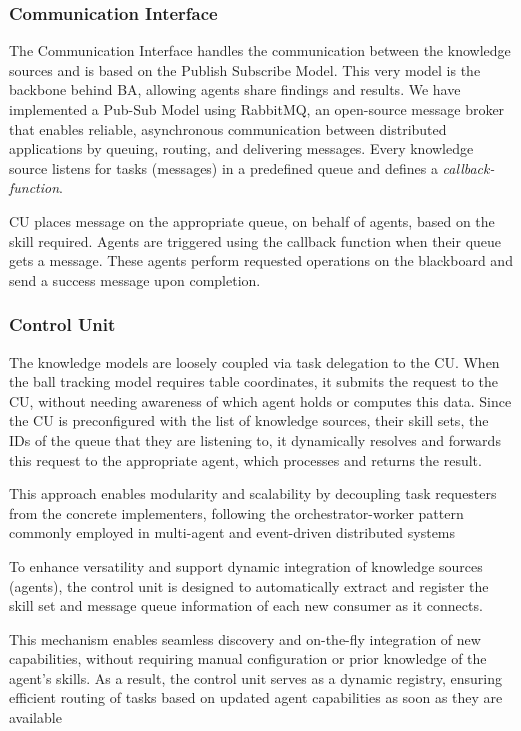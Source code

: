 \documentclass[conference]{IEEEtran}
\begin{document}
\subsubsection{Communication Interface}
The Communication Interface handles the communication between the knowledge sources and is based on the Publish Subscribe Model. This very model is the backbone behind BA, allowing agents share findings and results. 
We have implemented a Pub-Sub Model using RabbitMQ, an open-source message broker that enables reliable, asynchronous communication between distributed applications by queuing, routing, and delivering messages. Every knowledge source listens for tasks (messages) in a predefined queue and defines a \textit{callback-function}. 

CU places message on the appropriate queue, on behalf of agents, based on the skill required. Agents are triggered using the callback function when their queue gets a message. These agents perform requested operations on the blackboard and send a success message upon completion. 

\subsubsection{Control Unit}
The knowledge models are loosely coupled via task delegation to the CU. When the ball tracking model requires table coordinates, it submits the request to the CU, without needing awareness of which agent holds or computes this data. 
Since the CU is preconfigured with the list of knowledge sources, their skill sets, the IDs of the queue that they are listening to, it dynamically resolves and forwards this request to the appropriate agent, which processes and returns the result. 

This approach enables modularity and scalability by decoupling task requesters from the concrete implementers, following the orchestrator-worker pattern commonly employed in multi-agent and event-driven distributed systems

To enhance versatility and support dynamic integration of knowledge sources (agents), the control unit is designed to automatically extract and register the skill set and message queue information of each new consumer as it connects. 

This mechanism enables seamless discovery and on-the-fly integration of new capabilities, without requiring manual configuration or prior knowledge of the agent’s skills. As a result, the control unit serves as a dynamic registry, ensuring efficient routing of tasks based on updated agent capabilities as soon as they are available
\end{document}
